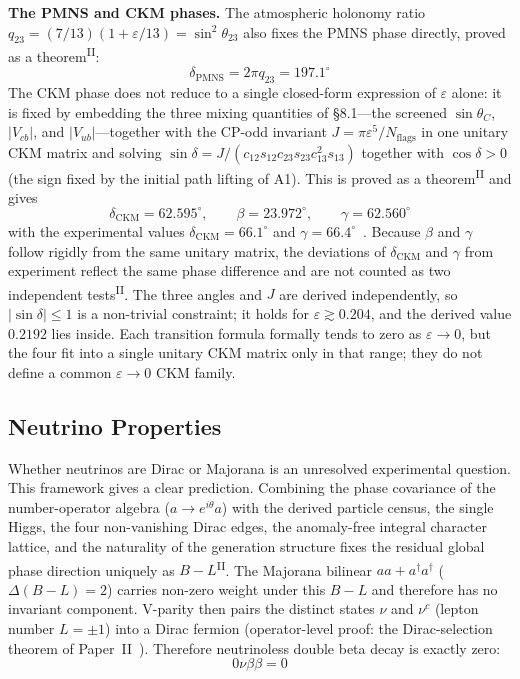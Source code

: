 \documentclass[12pt,a4paper]{article}
\newcommand{\PII}{\textsuperscript{\textup{II}}}
\begin{document}
\noindent\textbf{The PMNS and CKM phases.}\;
The atmospheric holonomy ratio $q_{23} = (7/13)(1+\varepsilon/13) = \sin^2\!\theta_{23}$ also fixes the PMNS phase directly, proved as a theorem\PII{}:
\begin{equation}
\delta_\mathrm{PMNS} = 2\pi q_{23} = 197.1^\circ
\end{equation}
The CKM phase does not reduce to a single closed-form expression of $\varepsilon$ alone: it is fixed by embedding the three mixing quantities of \S8.1---the screened $\sin\theta_C$, $|V_{cb}|$, and $|V_{ub}|$---together with the CP-odd invariant $J = \pi\varepsilon^5/N_\mathrm{flags}$ in one unitary CKM matrix and solving $\sin\delta = J/(c_{12}s_{12}c_{23}s_{23}c_{13}^2 s_{13})$ together with $\cos\delta > 0$ (the sign fixed by the initial path lifting of A1). This is proved as a theorem\PII{} and gives
\begin{equation}
\delta_\mathrm{CKM} = 62.595^\circ,\qquad \beta = 23.972^\circ,\qquad \gamma = 62.560^\circ
\end{equation}
with the experimental values $\delta_\mathrm{CKM} = 66.1^\circ$ and $\gamma = 66.4^\circ$~\cite{pdg}. Because $\beta$ and $\gamma$ follow rigidly from the same unitary matrix, the deviations of $\delta_\mathrm{CKM}$ and $\gamma$ from experiment reflect the same phase difference and are not counted as two independent tests\PII{}. The three angles and $J$ are derived independently, so $|\sin\delta| \le 1$ is a non-trivial constraint; it holds for $\varepsilon \gtrsim 0.204$, and the derived value $0.2192$ lies inside. Each transition formula formally tends to zero as $\varepsilon \to 0$, but the four fit into a single unitary CKM matrix only in that range; they do not define a common $\varepsilon \to 0$ CKM family.



\subsection{Neutrino Properties}

Whether neutrinos are Dirac or Majorana is an unresolved experimental question. This framework gives a clear prediction. Combining the phase covariance of the number-operator algebra ($a \to e^{i\theta}a$) with the derived particle census, the single Higgs, the four non-vanishing Dirac edges, the anomaly-free integral character lattice, and the naturality of the generation structure fixes the residual global phase direction uniquely as $B-L$\PII{}. The Majorana bilinear $aa + a^\dagger a^\dagger$ ($\Delta(B{-}L) = 2$) carries non-zero weight under this $B-L$ and therefore has no invariant component.
V-parity then pairs the distinct states $\nu$ and $\nu^c$
(lepton number $L = \pm 1$) into a Dirac fermion (operator-level proof: the Dirac-selection theorem of Paper~II~\cite{paper2}).
Therefore neutrinoless double beta decay is exactly zero:
\begin{equation}
  0\nu\beta\beta = 0
\end{equation}
\end{document}
